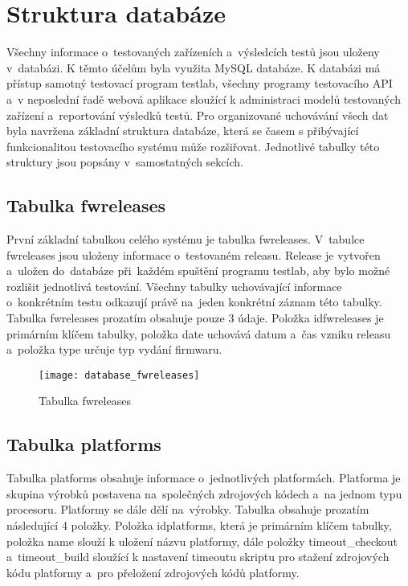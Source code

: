 \section{Struktura databáze}
Všechny informace o~testovaných zařízeních a~výsledcích testů jsou uloženy v~databázi. K těmto účelům byla využita MySQL databáze. K databázi má přístup samotný testovací program testlab, všechny programy testovacího API a~v neposlední řadě webová aplikace sloužící k administraci modelů testovaných zařízení a~reportování výsledků testů. Pro organizované uchovávání všech dat byla navržena základní struktura databáze, která se časem s přibývající funkcionalitou testovacího systému může rozšiřovat. Jednotlivé tabulky této struktury jsou popsány v~samostatných sekcích.

\subsection{Tabulka fwreleases}
První základní tabulkou celého systému je tabulka fwreleases. V~tabulce fwreleases jsou uloženy informace o~testovaném releasu. Release je vytvořen a~uložen do~databáze při~každém spuštění programu testlab, aby bylo možné rozlišit jednotlivá testování. Všechny tabulky uchovávající informace o~konkrétním testu odkazují právě na~jeden konkrétní záznam této tabulky. Tabulka fwreleases prozatím obsahuje pouze 3 údaje. Položka idfwreleases je primárním klíčem tabulky, položka date uchovává datum a~čas vzniku releasu a~položka type určuje typ vydání firmwaru.

\begin{figure}[h]
  \centering
  \texttt{[image: database\_fwreleases]}
  \caption{Tabulka fwreleases}
  \label{fig:database_fwreleases}
\end{figure}

\subsection{Tabulka platforms}
Tabulka platforms obsahuje informace o~jednotlivých platformách. Platforma je skupina výrobků postavena na~společných zdrojových kódech a~na jednom typu procesoru. Platformy se dále dělí na~výrobky. Tabulka obsahuje prozatím následující 4 položky. Položka idplatforms, která je primárním klíčem tabulky, položka name slouží k uložení názvu platformy, dále položky timeout\_checkout a~timeout\_build sloužící k nastavení timeoutu skriptu pro stažení zdrojových kódu platformy a~pro přeložení zdrojových kódů platformy.

